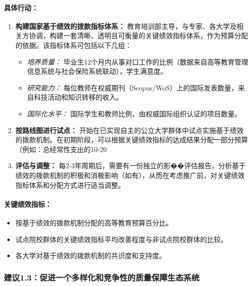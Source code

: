 \paragraph{具体行动：}
\begin{enumerate}
    \item \textbf{构建国家基于绩效的拨款指标体系：} 教育培训部主导，与专家、各大学及相关方协调，构建一套清晰、透明且可衡量的关键绩效指标体系，作为预算分配的依据。该指标体系可包括以下几组：
        \begin{itemize}
            \item \textit{培养质量：} 毕业生12个月内从事对口工作的比例（数据来自高等教育管理信息系统与社会保险系统联动），学生满意度。
            \item \textit{研究能力：} 每位教师在权威期刊（Scopus/WoS）上的国际发表数量，来自科技活动和知识转移的收入。
            \item \textit{国际化水平：} 国际学生和教师比例，由权威国际组织认证的项目数量。
        \end{itemize}
    \item \textbf{按路线图进行试点：} 开始在已实现自主的公立大学群体中试点实施基于绩效的拨款机制。在初期阶段，可以根据关键绩效指标的达成结果分配一部分预算（例如：总经常性支出的10-20%
    \item \textbf{评估与调整：} 每2-3年周期后，需要有一份独立的影��评估报告，分析基于绩效的拨款机制的积极和消极影响（如有），从而在考虑推广前，对关键绩效指标体系和分配方式进行适当调整。
\end{enumerate}

\paragraph{关键绩效指标：}
\begin{itemize}
    \item 按基于绩效的拨款机制分配的高等教育预算百分比。
    \item 试点院校群体的关键绩效指标平均改善程度与非试点院校群体的比较。
    \item 各大学对基于绩效的拨款机制的共识度和支持度。
\end{itemize}




\subsubsection{建议1.3：促进一个多样化和竞争性的质量保障生态系统}

